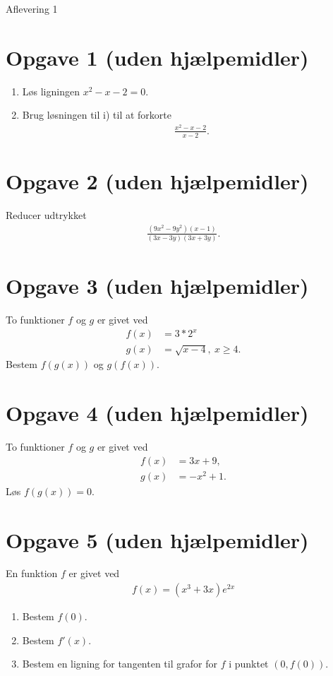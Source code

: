\begin{center}
\Huge
Aflevering 1
\end{center}
\section*{Opgave 1 \large (uden hjælpemidler)}
\begin{enumerate}[label=\roman*)]
\item Løs ligningen $x^2-x-2 = 0$.
\item Brug løsningen til i) til at forkorte
\begin{align*}
\frac{x^2-x-2}{x-2}.
\end{align*}
\end{enumerate}

\section*{Opgave 2 \large (uden hjælpemidler)}
Reducer udtrykket 
\begin{align*}
\frac{(9x^2-9y^2)(x-1)}{(3x-3y)(3x+3y)}.
\end{align*}

\section*{Opgave 3 \large (uden hjælpemidler)}
To funktioner $f$ og $g$ er givet ved 
\begin{align*}
f(x) &= 3*2^x\\
g(x) &= \sqrt{x-4}, \ x\geq 4.
\end{align*}
Bestem $f(g(x))$ og $g(f(x))$.

\section*{Opgave 4 \large (uden hjælpemidler)}
To funktioner $f$ og $g$ er givet ved 
\begin{align*}
f(x) &= 3x+9,\\
g(x) &= -x^2+1.
\end{align*}
Løs $f(g(x)) = 0$.

\section*{Opgave 5 \large (uden hjælpemidler)}
En funktion  $f$ er givet ved 
\begin{align*}
f(x) = (x^3+3x)e^{2x}
\end{align*}
\begin{enumerate}[label=\roman*)]
\item Bestem $f(0)$.
\item Bestem $f'(x)$.
\item Bestem en ligning for tangenten til grafor for $f$ i punktet $(0,f(0))$.
\end{enumerate}

